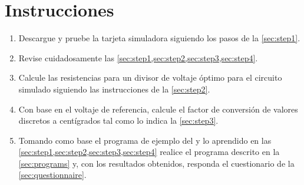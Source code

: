 %
%



\cleardoublepage
\section{Instrucciones}%
\label{sec:instructions}
\begin{enumerate}[noitemsep]
	\item Descargue y pruebe la tarjeta simuladora siguiendo los pasos de la \cref{sec:step1}.

	\item Revise cuidadosamente las \cref{sec:step1,sec:step2,sec:step3,sec:step4}.

	\item Calcule las resistencias para un divisor de voltaje óptimo para el circuito simulado siguiendo las instrucciones de la \cref{sec:step2}.

	\item Con base en el voltaje de referencia, calcule el factor de conversión de valores discretos a centígrados tal como lo indica la \cref{sec:step3}.

	\item Tomando como base el programa de ejemplo del 
	y lo aprendido en las \cref{sec:step1,sec:step2,sec:step3,sec:step4}
	realice el programa descrito en la \cref{sec:programs} y, con los resultados obtenidos, responda el cuestionario de la \cref{sec:questionnaire}.
\end{enumerate}




